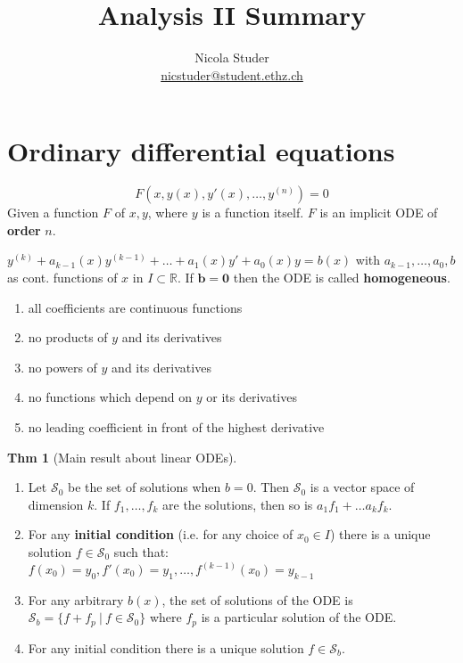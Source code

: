 \documentclass[a4paper, 10pt]{article}
\title{Analysis II Summary}
\author{Nicola Studer \\ \href{mailto:nicstuder@student.ethz.ch}{nicstuder@student.ethz.ch}}
\date{\vspace{-5ex}}
\theoremstyle{definition}
\newtheorem*{theorem}{Thm}
\newcommand{\R}{\mathbb{R}}
\begin{document}
\maketitle

\section{Ordinary differential equations}
\[F(x, y(x), y'(x), \ldots, y^{(n)}) = 0\]
Given a function \(F\) of \(x, y\), where \(y\) is a function itself. \(F\) is an implicit ODE of \textbf{order} \(n\).

\begin{note*}
    \(y^{(k)} + a_{k-1}(x)y^{(k-1)} + \ldots + a_1(x)y' + a_0(x)y = b(x)\)
    with \(a_{k-1}, \ldots, a_0, b\) as cont. functions of \(x\) in \(I \subset \R\). If \(\bm{b = 0}\) then the ODE is called \textbf{homogeneous}.
\end{note*}

\begin{ntheorem*}
    \begin{enumerate}
        \item all coefficients are continuous functions
        \item no products of \(y\) and its derivatives
        \item no powers of \(y\) and its derivatives
        \item no functions which depend on \(y\) or its derivatives
        \item no leading coefficient in front of the highest derivative
    \end{enumerate}
\end{ntheorem*}

\begin{theorem}[Main result about linear ODEs]
    \(\;\)
    \begin{enumerate}
        \item Let \(\mathcal{S}_0\) be the set of solutions when \(b = 0\). Then \(\mathcal{S}_0\) is a vector space of dimension \(k\). If \(f_1, \ldots, f_k\) are the solutions, then so is \(a_1f_1+ \ldots a_kf_k\).
        \item For any \textbf{initial condition} (i.e. for any choice of \(x_0 \in I\)) there is a unique solution \(f \in \mathcal{S}_0\) such that: \\
        \(f(x_0) = y_0, f'(x_0) = y_1, \ldots, f^{(k-1)}(x_0) = y_{k-1}\)
        \item For any arbitrary \(b(x)\), the set of solutions of the ODE is \(\mathcal{S}_b = \{f + f_p \ | \ f \in \mathcal{S}_0\}\) where \(f_p\) is a particular solution of the ODE.
        \item For any initial condition there is a unique solution \(f \in \mathcal{S}_b\).
    \end{enumerate}
\end{theorem}
\end{document}
